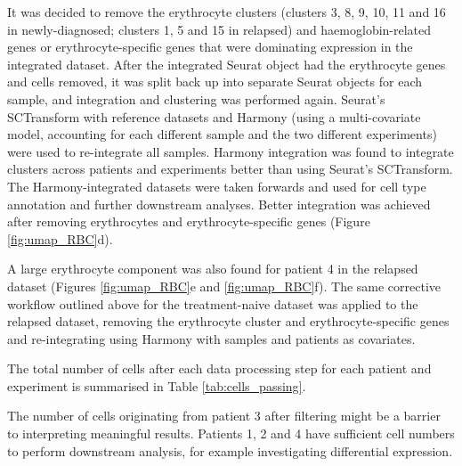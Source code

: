 It was decided to remove the erythrocyte clusters (clusters 3, 8, 9, 10, 11 and 16 in newly-diagnosed; clusters 1, 5 and 15 in relapsed) and haemoglobin-related genes or erythrocyte-specific genes that were dominating expression in the integrated dataset.
After the integrated Seurat object had the erythrocyte genes and cells removed, it was split back up into separate Seurat objects for each sample, and integration and clustering was performed again.
Seurat's SCTransform with reference datasets and Harmony (using a multi-covariate model, accounting for each different sample and the two different experiments) were used to re-integrate all samples.
Harmony integration was found to integrate clusters across patients and experiments better than using Seurat's SCTransform.
The Harmony-integrated datasets were taken forwards and used for cell type annotation and further downstream analyses.
Better integration was achieved after removing erythrocytes and erythrocyte-specific genes (Figure \ref{fig:umap_RBC}d).

A large erythrocyte component was also found for patient 4 in the relapsed dataset (Figures \ref{fig:umap_RBC}e and \ref{fig:umap_RBC}f).
The same corrective workflow outlined above for the treatment-naive dataset was applied to the relapsed dataset, removing the erythrocyte cluster and erythrocyte-specific genes and re-integrating using Harmony with samples and patients as covariates.

The total number of cells after each data processing step for each patient and experiment is summarised in Table \ref{tab:cells_passing}.

The number of cells originating from patient 3 after filtering might be a barrier to interpreting meaningful results.
Patients 1, 2 and 4 have sufficient cell numbers to perform downstream analysis, for example investigating differential expression.

